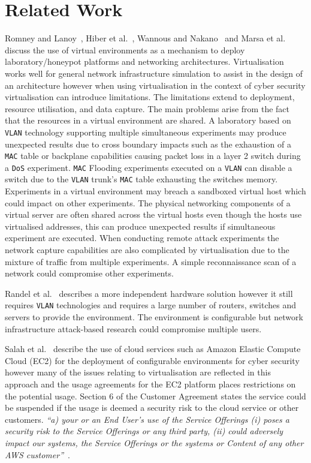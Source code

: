 \documentclass[10pt,journal]{IEEEtran}
\begin{document}
\section{Related Work}\label{sec:RelatedWork}
Romney and Lanoy~\cite{LR:06}, Hiber et al.~\cite{HRS:08}, Wannous and Nakano~\cite{WN:10} and Marsa et al.~\cite{MGDL:13} discuss the use of virtual environments as a mechanism to deploy laboratory/honeypot platforms and networking architectures. Virtualisation works well for general network infrastructure simulation to assist in the design of an architecture however when using virtualisation in the context of cyber security virtualisation can introduce limitations. The limitations extend to deployment, resource utilisation, and data capture. The main problems arise from the fact that the resources in a virtual environment are shared. A laboratory based on \texttt{VLAN} technology supporting multiple simultaneous experiments may produce unexpected results due to cross boundary impacts such as the exhaustion of a \texttt{MAC} table or backplane capabilities causing packet loss in a layer 2 switch during a \texttt{DoS} experiment. \texttt{MAC} Flooding experiments executed on a \texttt{VLAN} can disable a switch due to the \texttt{VLAN} trunk's \texttt{MAC} table exhausting the switches memory. Experiments in a virtual environment may breach a sandboxed virtual host which could impact on other experiments. The physical networking components of a virtual server are often shared across the virtual hosts even though the hosts use virtualised addresses, this can produce unexpected results if simultaneous experiment are executed. When conducting remote attack experiments the network capture capabilities are also complicated by virtualisation due to the mixture of traffic from multiple experiments. A simple reconnaissance scan of a network could compromise other experiments.

Randel et al.~\cite{ACG:06} describes a more independent hardware solution however it still requires \texttt{VLAN} technologies and requires a large number of routers, switches and servers to provide the environment. The environment is configurable but network infrastructure attack-based research could compromise multiple users.

Salah et al.~\cite{SHZ:15} describe the use of cloud services such as Amazon Elastic Compute Cloud (EC2) for the deployment of configurable environments for cyber security however many of the issues relating to virtualisation are reflected in this approach and the usage agreements for the EC2 platform places restrictions on the potential usage. Section 6 of the Customer Agreement states the service could be suspended if the usage is deemed a security risk to the cloud service or other customers. \textit{``a) your or an End User’s use of the Service Offerings (i) poses a security risk to the Service Offerings or any third party, (ii) could adversely impact our systems, the Service Offerings or the systems or Content of any other AWS customer''}~\cite{AWS:18}.
\end{document}
